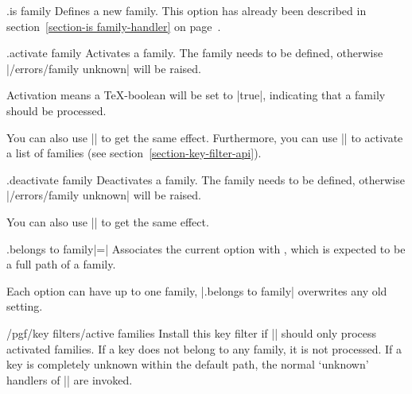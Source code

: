 \begin{handler}{{.is family}}
	Defines a new family. This option has already been described in section~\ref{section-is family-handler} on page~\pageref{section-is family-handler}.
\end{handler}

\begin{handler}{{.activate family}}
	Activates a family. The family needs to be defined, otherwise |/errors/family unknown| will be raised.

	Activation means a \TeX-boolean will be set to |true|, indicating that a family should be processed.

	You can also use |\pgfkeysactivatefamily| to get the same effect. Furthermore, you can use |\pgfkeysactivatefamilies| to activate a list of families (see section~\ref{section-key-filter-api}).
\end{handler}

\begin{handler}{{.deactivate family}}
	Deactivates a family. The family needs to be defined, otherwise |/errors/family unknown| will be raised.

	You can also use |\pgfkeysdeactivatefamily| to get the same effect.
\end{handler}

\begin{handler}{{.belongs to family}|=|}
	Associates the current option with , which is expected to be a full path of a family.
\begin{codeexample}
\end{codeexample}
	Each option can have up to one family, |.belongs to family| overwrites any old setting.
\end{handler}

\begin{key}{/pgf/key filters/active families}
	Install this key filter if |\pgfkeysfiltered| should only process activated families. If a key does not belong to any family, it is not processed. If a key is completely unknown within the default path, the normal `unknown' handlers of |\pgfkeys| are invoked.
\end{key}

